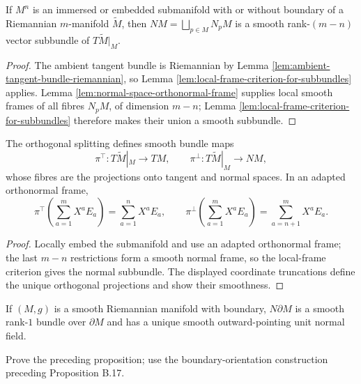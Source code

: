 \begin{proposition}
\label{prop:normal-bundle}
\leanok
{}
If $M^n$ is an immersed or embedded submanifold with or without boundary of a Riemannian $m$-manifold $\widetilde M$, then $NM=\bigsqcup_{p\in M}N_pM$ is a smooth rank-$(m-n)$ vector subbundle of $T\widetilde M|_M$.
\end{proposition}
\begin{proof}
\leanok
{}
\sketch The ambient tangent bundle is Riemannian by Lemma \ref{lem:ambient-tangent-bundle-riemannian}, so Lemma \ref{lem:local-frame-criterion-for-subbundles} applies. Lemma \ref{lem:normal-space-orthonormal-frame} supplies local smooth frames of all fibres $N_pM$, of dimension $m-n$; Lemma \ref{lem:local-frame-criterion-for-subbundles} therefore makes their union a smooth subbundle.
\end{proof}

\begin{remark}
\label{rem:normal-bundle-projections}
The orthogonal splitting defines smooth bundle maps
\[
\pi^\top:T\widetilde M|_M\to TM,\qquad \pi^\perp:T\widetilde M|_M\to NM,
\]
whose fibres are the projections onto tangent and normal spaces. In an adapted orthonormal frame,
\[
\pi^\top\!\left(\sum_{a=1}^mX^aE_a\right)=\sum_{a=1}^nX^aE_a,\qquad
\pi^\perp\!\left(\sum_{a=1}^mX^aE_a\right)=\sum_{a=n+1}^mX^aE_a.
\]
\end{remark}

\begin{proof}
\sketch Locally embed the submanifold and use an adapted orthonormal frame; the last $m-n$ restrictions form a smooth normal frame, so the local-frame criterion gives the normal subbundle. The displayed coordinate truncations define the unique orthogonal projections and show their smoothness.
\end{proof}

\begin{proposition}
\label{prop:outward-pointing-normal}
If $(M,g)$ is a smooth Riemannian manifold with boundary, $N\partial M$ is a smooth rank-$1$ bundle over $\partial M$ and has a unique smooth outward-pointing unit normal field.
\end{proposition}
\begin{exercise}
\label{exer:prove-outward-normal}
Prove the preceding proposition; use the boundary-orientation construction preceding Proposition B.17.
\end{exercise}

